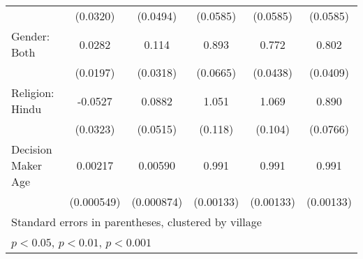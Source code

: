 {\begin{tabular}{l*{5}{c}}
                    &    (0.0320)         &    (0.0494)          &    (0.0585)         &    (0.0585)         &    (0.0585)         \\
[1em]
Gender: Both          &      0.0282         &       0.114\sym{***}&       0.893         &       0.772\sym{***}&       0.802\sym{***}\\
                    &    (0.0197)         &    (0.0318)        &    (0.0665)         &    (0.0438)         &    (0.0409)         \\
[1em]
Religion: Hindu        &     -0.0527         &      0.0882         &       1.051         &       1.069         &       0.890         \\
                    &    (0.0323)         &    (0.0515)         &     (0.118)         &     (0.104)         &    (0.0766)         \\
[1em]
Decision Maker Age           &     0.00217\sym{***}&     0.00590\sym{***}&       0.991\sym{***}&       0.991\sym{***}&       0.991\sym{***}\\
                    &  (0.000549)         &  (0.000874)         &   (0.00133)         &   (0.00133)         &   (0.00133)         \\
\hline\hline
\multicolumn{6}{l}{\footnotesize Standard errors in parentheses, clustered by village}\\
\multicolumn{6}{l}{\footnotesize \sym{*} \(p<0.05\), \sym{**} \(p<0.01\), \sym{***} \(p<0.001\)}\\
\end{tabular}%
}